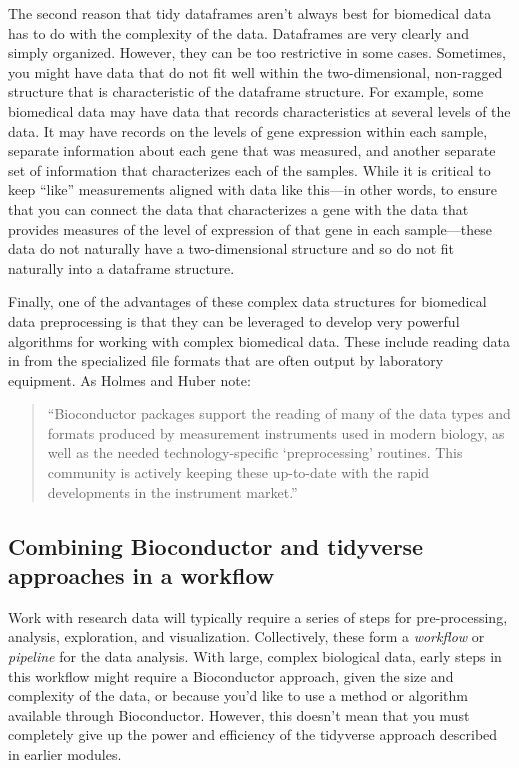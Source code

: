 \documentclass[]{tufte-book}
\begin{document}
The second reason that tidy dataframes aren't always best for biomedical data
has to do with the complexity of the data. Dataframes are very clearly and
simply organized. However, they can be too restrictive in some cases. Sometimes,
you might have data that do not fit well within the two-dimensional, non-ragged
structure that is characteristic of the dataframe structure. For example, some
biomedical data may have data that records characteristics at several levels of
the data. It may have records on the levels of gene expression within each
sample, separate information about each gene that was measured, and another
separate set of information that characterizes each of the samples. While it is
critical to keep ``like'' measurements aligned with data like this---in other
words, to ensure that you can connect the data that characterizes a gene with
the data that provides measures of the level of expression of that gene in each
sample---these data do not naturally have a two-dimensional structure and so do
not fit naturally into a dataframe structure.

Finally, one of the advantages of these complex data structures for biomedical
data preprocessing is that they can be leveraged to develop very powerful
algorithms for working with complex biomedical data. These include reading data
in from the specialized file formats that are often output by laboratory
equipment. As Holmes and Huber note:

\begin{quote}
``Bioconductor packages support the reading of many of the data types and formats
produced by measurement instruments used in modern biology, as well as the
needed technology-specific `preprocessing' routines. This community is
actively keeping these up-to-date with the rapid developments in the
instrument market.'' \citep{holmes2018modern}
\end{quote}

\subsection{Combining Bioconductor and tidyverse approaches in a workflow}\label{combining-bioconductor-and-tidyverse-approaches-in-a-workflow}

Work with research data will typically require a series of steps for
pre-processing, analysis, exploration, and visualization. Collectively, these
form a \emph{workflow} or \emph{pipeline} for the data analysis. With large, complex
biological data, early steps in this workflow might require a Bioconductor
approach, given the size and complexity of the data, or because you'd like to
use a method or algorithm available through Bioconductor. However, this doesn't
mean that you must completely give up the power and efficiency of the tidyverse
approach described in earlier modules.
\end{document}

